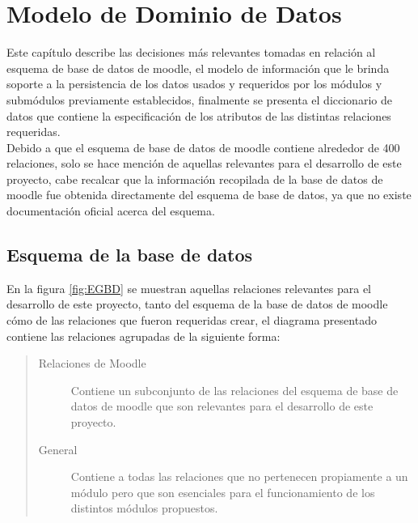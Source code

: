\chapter{Modelo de Dominio de Datos}
\label{ch:dominioDatos}

 Este capítulo describe las decisiones más relevantes tomadas en relación al esquema de
 base de datos de moodle, el modelo de información que le brinda soporte a la persistencia
 de los datos usados y requeridos por los módulos y submódulos previamente establecidos,
 finalmente se presenta el diccionario de datos que contiene la especificación de los
 atributos de las distintas relaciones requeridas.\\

 \noindent Debido a que el esquema de base de datos de moodle contiene alrededor de 400
 relaciones, solo se hace mención de aquellas relevantes para el desarrollo de este proyecto,
 cabe recalcar que la información recopilada de la base de datos de moodle fue obtenida
 directamente del esquema de base de datos, ya que no existe documentación oficial acerca
 del esquema.

\section{Esquema de la base de datos}


 En la figura \ref{fig:EGBD} se muestran aquellas relaciones relevantes para el desarrollo
 de este proyecto, tanto del esquema de la base de datos de moodle cómo de las relaciones
 que fueron requeridas crear, el diagrama presentado contiene las relaciones agrupadas
 de la siguiente forma:\\

    \begin{quote}
    \begin{description}
        \item[Relaciones de Moodle] Contiene un subconjunto de las relaciones del esquema de
            base de datos de moodle que son relevantes para el desarrollo de este proyecto.\\

        \item[General] Contiene a todas las relaciones que no pertenecen propiamente a un
            módulo pero que son esenciales para el funcionamiento de los distintos módulos
            propuestos.\\

    \end{description}
    \end{quote}

